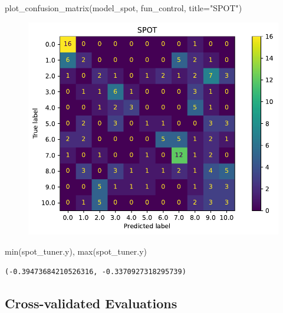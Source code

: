 \documentclass[
  letterpaper,
  DIV=11,
  numbers=noendperiod]{scrreprt}
\newenvironment{Shaded}{\begin{snugshade}}{\end{snugshade}}
\newcommand{\BuiltInTok}[1]{\textcolor[rgb]{0.00,0.23,0.31}{#1}}
\newcommand{\NormalTok}[1]{\textcolor[rgb]{0.00,0.23,0.31}{#1}}
\newcommand{\OperatorTok}[1]{\textcolor[rgb]{0.37,0.37,0.37}{#1}}
\newcommand{\StringTok}[1]{\textcolor[rgb]{0.13,0.47,0.30}{#1}}
\begin{document}
\begin{Shaded}
\begin{Highlighting}[]
\NormalTok{plot\_confusion\_matrix(model\_spot, fun\_control, title}\OperatorTok{=}\StringTok{"SPOT"}\NormalTok{)}
\end{Highlighting}
\end{Shaded}

\begin{figure}[H]

{\centering \includegraphics{18_spot_hpt_sklearn_multiclass_classification_svc_files/figure-pdf/cell-42-output-1.pdf}

}

\end{figure}

\begin{Shaded}
\begin{Highlighting}[]
\BuiltInTok{min}\NormalTok{(spot\_tuner.y), }\BuiltInTok{max}\NormalTok{(spot\_tuner.y)}
\end{Highlighting}
\end{Shaded}

\begin{verbatim}
(-0.39473684210526316, -0.3370927318295739)
\end{verbatim}

\hypertarget{cross-validated-evaluations-2}{%
\subsection{Cross-validated
Evaluations}\label{cross-validated-evaluations-2}}
\end{document}

